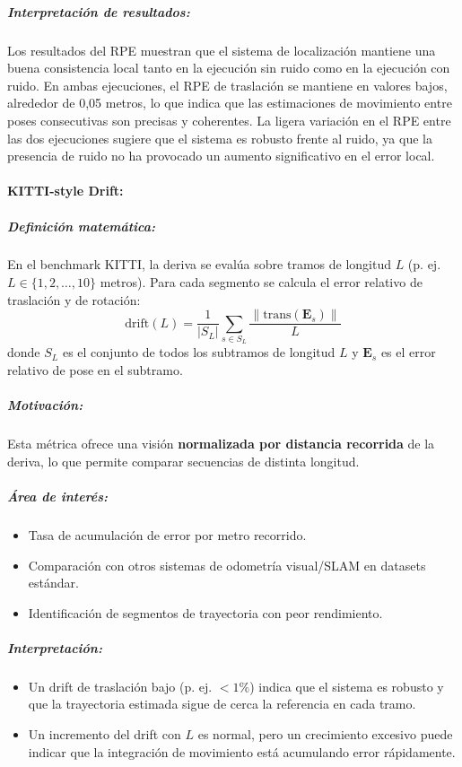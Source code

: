 \documentclass[12pt, a4paper, twoside]{article}
\begin{document}
\subparagraph{Interpretación de resultados:}
Los resultados del RPE\cite{Sturm2012RPE} muestran que el sistema de localización mantiene una buena consistencia local tanto en la ejecución sin ruido como en la ejecución con ruido.
En ambas ejecuciones, el RPE\cite{Sturm2012RPE} de traslación se mantiene en valores bajos, alrededor de 0,05 metros, lo que indica que las estimaciones de movimiento entre poses consecutivas
son precisas y coherentes.\newline
La ligera variación en el RPE\cite{Sturm2012RPE} entre las dos ejecuciones sugiere que el sistema es robusto frente al ruido, ya que la presencia de ruido no ha provocado un aumento significativo en
el error local.\newline

\paragraph{KITTI-style Drift\cite{Geiger2013KITTI}:}
\subparagraph{Definición matemática:}
En el benchmark KITTI\cite{Geiger2013KITTI}, la deriva se evalúa sobre tramos de longitud $L$ (p. ej. $L \in \{1,2, \dots,10\}$ metros).
Para cada segmento se calcula el error relativo de traslación y de rotación:
\[
\text{drift}(L) = 
\frac{1}{|S_L|} \sum_{s \in S_L}
\frac{\| \mathrm{trans}(\mathbf{E}_s)\|}{L}
\]
donde $S_L$ es el conjunto de todos los subtramos de longitud $L$ y 
$\mathbf{E}_s$ es el error relativo de pose en el subtramo.

\subparagraph{Motivación:}
Esta métrica ofrece una visión \textbf{normalizada por distancia recorrida} 
de la deriva, lo que permite comparar secuencias de distinta longitud.

\subparagraph{Área de interés:}
\begin{itemize}
  \item Tasa de acumulación de error por metro recorrido.
  \item Comparación con otros sistemas de odometría visual/SLAM\cite{smith1987slam} en datasets estándar.
  \item Identificación de segmentos de trayectoria con peor rendimiento.
\end{itemize}

\subparagraph{Interpretación:}
\begin{itemize}
  \item Un drift de traslación bajo (p. ej. $< 1\%$) indica que el sistema es robusto 
  y que la trayectoria estimada sigue de cerca la referencia en cada tramo.
  \item Un incremento del drift con $L$ es normal, pero un crecimiento excesivo 
  puede indicar que la integración de movimiento está acumulando error rápidamente.
\end{itemize}
\end{document}
